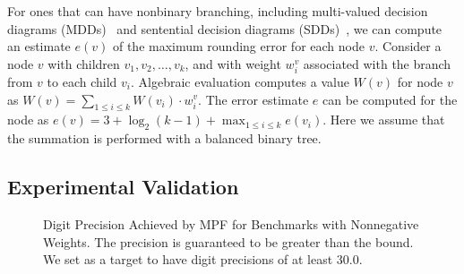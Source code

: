 \documentclass[letterpaper,USenglish,cleveref, autoref, thm-restate]{lipics-v2021}
\begin{document}
For ones that can have nonbinary branching, including
multi-valued decision diagrams
(MDDs)~\cite{srinivasan:iccad:1990} and sentential decision diagrams
(SDDs)~\cite{darwiche:ijcai:2011}, we can compute an estimate $e(v)$ of the maximum rounding error for each node $v$.
Consider a node $v$ with children
$v_1, v_2, \ldots, v_k$, and with weight $w_i^{v}$ associated with the branch from $v$ to each child $v_i$.
Algebraic evaluation computes a value $W(v)$ for node $v$ as
$W(v) = \sum_{1\leq i\leq k} W(v_i)\cdot w_i^{v}$.
The error estimate $e$ can be computed for the node as
$e(v) = 3 + \log_2(k-1) + \max_{1\leq i \leq k} e(v_i)$.
Here we assume that the summation is performed with a balanced binary tree.

\subsection{Experimental Validation}

\begin{figure}
\caption{Digit Precision Achieved by MPF for Benchmarks with Nonnegative Weights.  The precision is guaranteed to be greater than the bound.
We set as a target to have digit precisions of at least 30.0.}
\label{fig:pos:mpf}
\end{figure}
\end{document}
